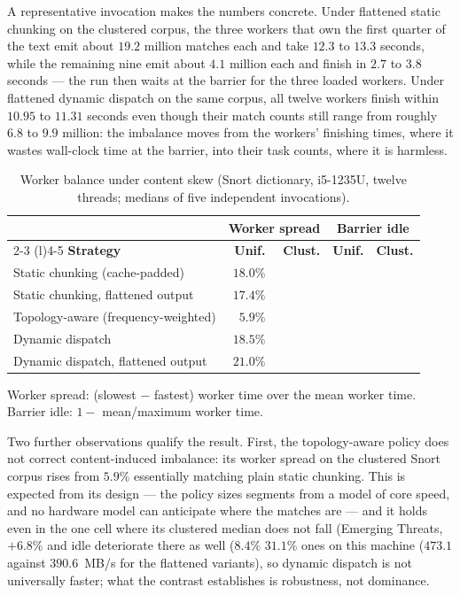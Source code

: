A representative invocation makes the numbers concrete. Under flattened static
chunking on the clustered corpus, the three workers that own the first quarter
of the text emit about $19.2$ million matches each and take $12.3$ to $13.3$
seconds, while the remaining nine emit about $4.1$ million each and finish in
$2.7$ to $3.8$ seconds --- the run then waits at the barrier for the three
loaded workers. Under flattened dynamic dispatch on the same corpus, all twelve
workers finish within $10.95$ to $11.31$ seconds even though their match counts still
range from roughly $6.8$ to $9.9$ million: the imbalance moves from the workers'
finishing times, where it wastes wall-clock time at the barrier, into their task
counts, where it is harmless.

\begin{table}[H]
    \centering
    \caption{Worker balance under content skew (Snort dictionary, i5-1235U,
    twelve threads; medians of five independent invocations).}
    \label{tab:skew_balance}
    \small
    \begin{tabular}{@{} l rr rr @{}}
        \toprule
        & \multicolumn{2}{c}{\textbf{Worker spread}} & \multicolumn{2}{c}{\textbf{Barrier idle}} \\
        \cmidrule(lr){2-3} \cmidrule(l){4-5}
        \textbf{Strategy} & \textbf{Unif.} & \textbf{Clust.} & \textbf{Unif.} & \textbf{Clust.} \\
        \midrule
        Static chunking (cache-padded)         & $18.0\%$ \\
        Static chunking, flattened output      & $17.4\%$ \\
        Topology-aware (frequency-weighted)    & $5.9\%$ \\
        Dynamic dispatch                       & $18.5\%$ \\
        Dynamic dispatch, flattened output     & $21.0\%$ \\
        \bottomrule
    \end{tabular}

    {\footnotesize\raggedright Worker spread: (slowest $-$ fastest) worker time
    over the mean worker time. Barrier idle: $1 -$ mean/maximum worker time.\par}
\end{table}

Two further observations qualify the result. First, the topology-aware policy
does not correct content-induced imbalance: its worker spread on the clustered
Snort corpus rises from $5.9\%$
essentially matching plain static chunking. This is expected from its design ---
the policy sizes segments from a model of core speed, and no hardware model can
anticipate where the matches are --- and it holds even in the one cell where its
clustered median does not fall (Emerging Threats, $+6.8\%$
and idle deteriorate there as well ($8.4\%$
$31.1\%$
ones on this machine ($473.1$ against $390.6$~MB/s for the flattened variants),
so dynamic dispatch is not universally faster; what the contrast establishes is
robustness, not dominance.


